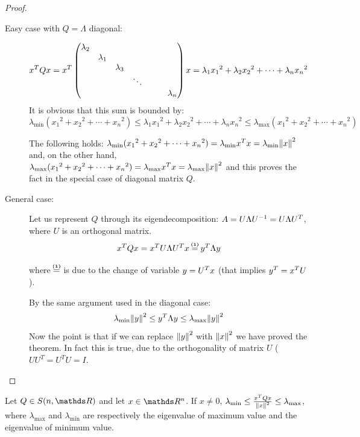 \documentclass[ComputationalMathematics.tex]{subfiles}
\begin{document}
\begin{proof}~\\
  \begin{description}
    \item[{\sc Easy case with $Q = \Lambda$ diagonal:}]
    
      $${x}^{T}Qx = {x}^{T} \begin{pmatrix}
    \lambda_2\\
    &\lambda_1\\
    &&\lambda_3\\
    &&& \ddots\\
    &&&&&&\lambda_n\\
    \end{pmatrix}
    x = \lambda_1 {x_1}^2 + \lambda_2 {x_2}^2 + \cdots + \lambda_n {x_n}^2$$
  It is obvious that this sum is bounded by:
  \[
    \lambda_{\text{min}} ({x_1}^2 +{x_2}^2 + \cdots + {x_n}^2) \le  \lambda_1 {x_1}^2 + \lambda_2 {x_2}^2 + \cdots + \lambda_n {x_n}^2 \le \lambda_{\text{max}} ({x_1}^2 +{x_2}^2 + \cdots + {x_n}^2)
  \]

      The following holds: $ \lambda_{\text{min}} ({x_1}^2 +{x_2}^2 + \cdots + {x_n}^2) =  \lambda_{\text{min}} {x}^{T} x =  \lambda_{\text{min}} {\left\lVert x\right\rVert}^2$ and, on the other hand, $ \lambda_{\text{max}} ({x_1}^2 +{x_2}^2 + \cdots + {x_n}^2) =  \lambda_{\text{max}} {x}^{T} x =  \lambda_{\text{max}} {\left\lVert x\right\rVert}^2$ and this proves the fact in the special case of diagonal matrix $Q$.
    \item[{\sc General case:}]
      Let us represent $Q$ through its eigendecomposition: $A = U \Lambda {U}^{-1} = U \Lambda {U}^{T}$, where $U$ is an orthogonal matrix.
      $$\tr{x}Qx = \tr{x} U \Lambda \tr{U} x \numeq{(1)} \tr{y} \Lambda y$$

      where $\numeq{(1)}$ is due to the change of variable $y = {U}^{T} x$ (that implies ${y}^{T} = {x}^{T} U$).

      By the same argument used in the diagonal case:
      $$\lambda_{\text{min}} {\left\lVert y\right\rVert}^2 \le {y}^{T} \Lambda y \le \lambda_{\text{max}} {\left\lVert y\right\rVert}^2$$
      Now the point is that if we can replace ${\left\lVert y\right\rVert}^2$ with ${\left\lVert x\right\rVert}^2$ we have proved the theorem.
      In fact this is true, due to the orthogonality of matrix $U$ ( $UU^T = U^TU = I$.
  \end{description}
\end{proof}

\begin{corollary}
  Let $Q \in S(n, \R)$ and let $x \in \R^n$. If $x \neq 0$, $\lambda_{\text{min}} \le \frac{{x}^{T}Qx}{{\left\lVert x\right\rVert}^2} \le \lambda_{\text{max}}$, where $\lambda_{\text{max}}$ and $\lambda_{\text{min}}$ are respectively the eigenvalue of maximum value and the eigenvalue of minimum value.
\end{corollary}
\end{document}
